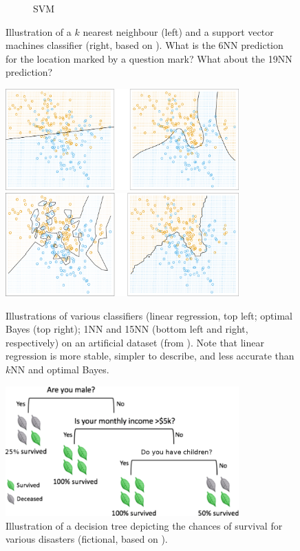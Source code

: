 \begin{figure}[!t]
\begin{subfigure}[b]{0.45\textwidth}
\caption{\small SVM}\label{fig:class2b}
\end{subfigure}
\caption[\small Illustration of $k$NN and SVM]{\small Illustration of a $k$ nearest neighbour (left) and a support vector machines classifier (right, based on \cite{DSML_PF}). What is the 6NN prediction for the location marked by a question mark? What about the 19NN prediction? }\label{fig:class2}
\end{figure}
\afterpage{\FloatBarrier}
\begin{figure}[!t]
\centering
\includegraphics[width=0.8\textwidth]{images/DSML/illustration1.png}
\includegraphics[width=0.8\textwidth]{images/DSML/illustration2.png}
\caption[\small Illustrations of linear regression, optimal Bayes, and $k$NN]{\small Illustrations of various classifiers (linear regression, top left; optimal Bayes (top right); 1NN and 15NN (bottom left and right, respectively) on an artificial dataset (from \cite{DSML_HTF}). Note that linear regression is more stable, simpler to describe, and less accurate than $k$NN and optimal Bayes.}\label{fig:class3}
\end{figure}
\afterpage{\FloatBarrier}
\begin{figure}[!t]
\centering
\includegraphics[width=0.8\textwidth]{images/DSML/tree_example.png}
\caption[\small Illustration of a decision tree]{\small Illustration of a decision tree depicting the chances of survival for various disasters (fictional, based on \cite{DSML_NS}).}\label{fig:class4}
\end{figure}
